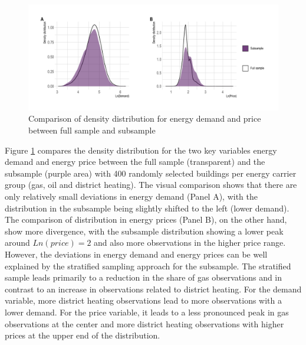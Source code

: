 \documentclass[12pt,twoside]{reedthesis}
\begin{document}
\newpage
\begin{figure}

{\centering \includegraphics[width=1\linewidth]{figure/density-distribution-comparison-samples} 

}

\caption{Comparison of density distribution for energy demand and price between full sample and subsample}\label{fig:density-distribution-comparison-samples}
\end{figure}
\noindent
Figure \ref{fig:density-distribution-comparison-samples} compares the density distribution for the two key variables energy demand and energy price between the full sample (transparent) and the subsample (purple area) with 400 randomly selected buildings per energy carrier group (gas, oil and district heating). The visual comparison shows that there are only relatively small deviations in energy demand (Panel A), with the distribution in the subsample being slightly shifted to the left (lower demand). The comparison of distribution in energy prices (Panel B), on the other hand, show more divergence, with the subsample distribution showing a lower peak around \(Ln(price) = 2\) and also more observations in the higher price range. However, the deviations in energy demand and energy prices can be well explained by the stratified sampling approach for the subsample. The stratified sample leads primarily to a reduction in the share of gas observations and in contrast to an increase in observations related to district heating. For the demand variable, more district heating observations lead to more observations with a lower demand. For the price variable, it leads to a less pronounced peak in gas observations at the center and more district heating observations with higher prices at the upper end of the distribution.

\newpage
\end{document}
